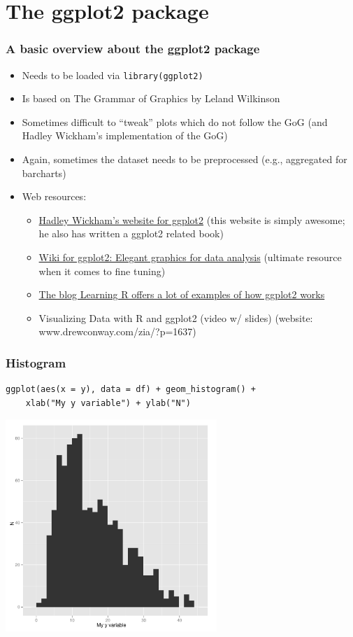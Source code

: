 \documentclass[bigger]{beamer}
\begin{document}
\section{The ggplot2 package}
\label{sec-3}
\begin{frame}[shrink = 10]
\frametitle{A basic overview about the ggplot2 package}
\label{sec-3_1}


\begin{itemize}
\item Needs to be loaded via \texttt{library(ggplot2)}
\item Is based on The Grammar of Graphics by Leland Wilkinson
\item Sometimes difficult to ``tweak'' plots which do not follow the GoG (and Hadley Wickham's
  implementation of the GoG)
\item Again, sometimes the dataset needs to be preprocessed (e.g., aggregated for barcharts)
\item Web resources:

\begin{itemize}
\item \href{http://had.co.nz/ggplot2/}{Hadley Wickham's website for ggplot2} (this website is simply awesome; he also has
    written a ggplot2 related book)
\item \href{https://github.com/hadley/ggplot2/wiki}{Wiki for ggplot2: Elegant graphics for data analysis} (ultimate resource when it comes to fine tuning)
\item \href{http://learnr.wordpress.com/}{The blog Learning R offers a lot of examples of how ggplot2 works}
\item Visualizing Data with R and ggplot2 (video w/ slides) (website: www.drewconway.com/zia/?p=1637)
\end{itemize}

\end{itemize}
\end{frame}
\begin{frame}[fragile]
\frametitle{Histogram}
\label{sec-3_2}


\lstset{language=R}
\begin{lstlisting}
ggplot(aes(x = y), data = df) + geom_histogram() + 
    xlab("My y variable") + ylab("N")
\end{lstlisting}



\includegraphics[width=0.6\textwidth]{../graphs/ggplot2_hist.pdf}
\end{frame}
\end{document}
